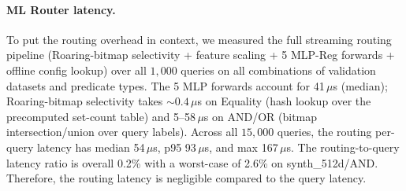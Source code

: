 

\paragraph{ML Router latency.}
\label{ssec:routing-latency}
To put the routing overhead in context, we measured the full streaming routing pipeline (Roaring-bitmap selectivity + feature scaling + 5 MLP-Reg forwards + offline config lookup) over all $1{,}000$ queries on all combinations of validation datasets and predicate types.
The 5 MLP forwards account for 41\,$\mu$s (median); Roaring-bitmap selectivity takes $\sim 0.4\,\mu$s on Equality (hash lookup over the precomputed set-count table) and 5--58\,$\mu$s on AND/OR (bitmap intersection/union over query labels). Across all $15{,}000$ queries, the routing per-query latency has median 54\,$\mu$s, p95 93\,$\mu$s, and max 167\,$\mu$s. The routing-to-query latency ratio is overall 0.2\% with a worst-case of 2.6\% on synth\_512d/AND.
Therefore, the routing latency is negligible compared to the query latency.

